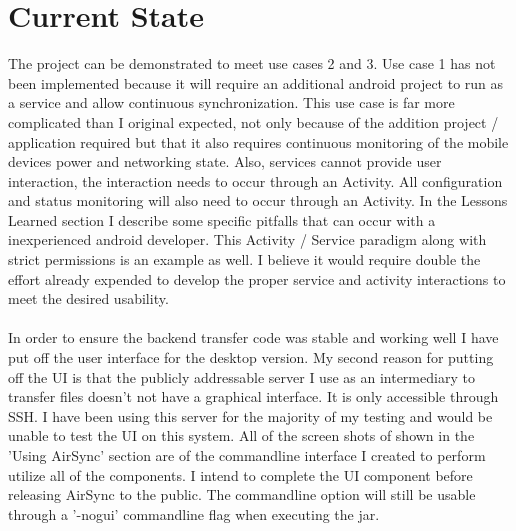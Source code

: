 \documentclass[12pt]{article}
\begin{document}
\section{Current State}
The project can be demonstrated to meet use cases 2 and 3.  Use case 1 has not been implemented because it will require an additional android project to run as a service and allow continuous synchronization.  This use case is far more complicated than I original expected, not only because of the addition project / application required but that it also requires continuous monitoring of the mobile devices power and networking state. Also, services cannot provide user interaction, the interaction needs to occur through an Activity. All configuration and status monitoring will also need to occur through an Activity.  In the Lessons Learned section I describe some specific pitfalls that can occur with a inexperienced android developer. This Activity / Service paradigm along with strict permissions is an example as well. I believe it would require double the effort already expended to develop the proper service and activity interactions to meet the desired usability.\\\\
In order to ensure the backend transfer code was stable and working well I have put off the user interface for the desktop version. My second reason for putting off the UI is that the publicly addressable server I use as an intermediary to transfer files doesn't not have a graphical interface. It is only accessible through SSH. I have been using this server for the majority of my testing and would be unable to test the UI on this system. All of the screen shots of shown in the 'Using AirSync' section are of the commandline interface I created to perform utilize all of the components. I intend to complete the UI component before releasing AirSync to the public. The commandline option will still be usable through a '-nogui' commandline flag when executing the jar.
\end{document}
